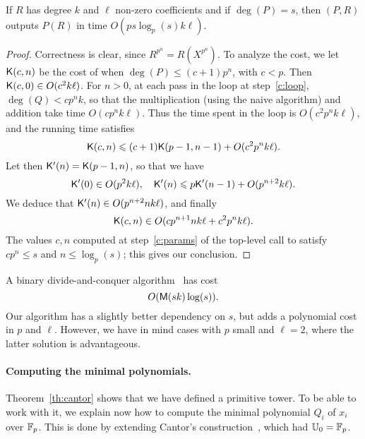 \begin{theorem}
  \label{theo:comp}
  If $R$ has degree $k$ and $\ell$ non-zero coefficients and if
  $\deg(P)=s$, then $(P,R)$ outputs $P(R)$ in time $O(ps
  \log_p(s)k\ell)$.
\end{theorem}
\begin{proof}
  Correctness is clear, since $R^{p^n}=R(X^{p^n})$. To analyze the
  cost, we let $\mathsf{K}(c,n)$ be the cost of {} when
  $\deg(P)\le (c+1)p^n$, with $c<p$. Then $\mathsf{K}(c,0) \in O(c^2k\ell)$.
  For $n > 0$, at each pass in the loop at step~\ref{c:loop}, $\deg(Q)
  < cp^n k$, so that the multiplication (using the naive algorithm)
  and addition take time $O(cp^nk\ell)$. Thus the time spent in the
  loop is $O(c^2p^{n}k\ell)$, and the running time
  satisfies
  \begin{equation}
    \label{eq:70}
    \mathsf{K}(c,n) \leqslant (c+1)\mathsf{K}(p-1,n-1) + O(c^2p^nk\ell)
    \text{.}    
  \end{equation}
  Let then $\mathsf{K}'(n)=\mathsf{K}(p-1,n)$, so that we have
  \begin{equation}
    \label{eq:71}
    \mathsf{K}'(0) \in O(p^2k\ell), \quad \mathsf{K}'(n) \leqslant p\mathsf{K}'(n-1) +
    O(p^{n+2}k\ell)
    \text{.}  
  \end{equation}
  We deduce that $\mathsf{K}'(n) \in O(p^{n+2}nk\ell)$,
  and finally
  \begin{equation}
    \label{eq:72}
    \mathsf{K}(c,n) \in O(cp^{n+1}nk\ell + c^2p^nk\ell)
    \text{.}  
  \end{equation}
  The values $c,n$ computed at step~\ref{c:params} of the top-level
  call to  satisfy $cp^n\le s$ and $n\le\log_p (s)$; this
  gives our conclusion.
\end{proof}

\begin{nota}
  A binary divide-and-conquer algorithm~\cite[Exercise~9.20]{vzGG} has
  cost 
  \[O(\mathsf{M}(sk)\log(s))\text{.}\] Our algorithm has a slightly better
  dependency on $s$, but adds a polynomial cost in $p$ and
  $\ell$. However, we have in mind cases with $p$ small and $\ell=2$,
  where the latter solution is advantageous.
\end{nota}

\paragraph{Computing the minimal polynomials.}
Theorem~\ref{th:cantor} shows that we have defined a primitive
tower. To be able to work with it, we explain now how to compute the
minimal polynomial $Q_i$ of $x_i$ over $\mathbb{F}_p$. This is done by
extending Cantor's construction~\cite{cantor89}, which had $\mathbb{U}_0=\mathbb{F}_p$.

